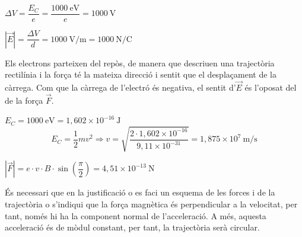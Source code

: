 \begin{solapartat}
\begin{minipage}[t]{0.72\linewidth}
 $\Delta V = \dfrac{E_C}{e} = \dfrac{1000\ \mathrm{eV}}{e} = 1000\ \mathrm{V}$

 $\left|\vec{E}\right| = \dfrac{\Delta V}{d} = 1000\ \mathrm{V/m} = 1000\ \mathrm{N/C}$

 Els electrons parteixen del repòs, de manera que descriuen una trajectòria rectilínia i la força té la mateixa direcció i sentit que el desplaçament de la càrrega. Com que la càrrega de l'electró és negativa, el sentit d'$\vec{E}$ és l'oposat del de la força $\vec{F}$.
\end{minipage}\hfill
\begin{minipage}[t]{0.24\linewidth}
\vspace{0pt}
\end{minipage}
\end{solapartat}

\begin{solapartat}
 $E_C = 1000\ \mathrm{eV} = 1,602\times 10^{-16}\ \mathrm{J}$
\[ E_C = \frac{1}{2}mv^2 \Longrightarrow v = \sqrt{\frac{2\cdot 1,602\times 10^{-16}}{9,11\times 10^{-31}}} = 1,875\times 10^{7}\ \mathrm{m/s} \]

 $\left|\vec{F}\right| = e\cdot v\cdot B\cdot \sin\left(\dfrac{\pi}{2}\right) = 4,51\times 10^{-13}\ \mathrm{N}$

\begin{minipage}[t]{0.78\linewidth}
 És necessari que en la justificació o es faci un esquema de les forces i de la trajectòria o s'indiqui que la força magnètica és perpendicular a la velocitat, per tant, només hi ha la component normal de l'acceleració. A més, aquesta acceleració és de mòdul constant, per tant, la trajectòria serà circular.
\end{minipage}\hfill
\begin{minipage}[t]{0.18\linewidth}
\vspace{0pt}
\end{minipage}
\end{solapartat}
